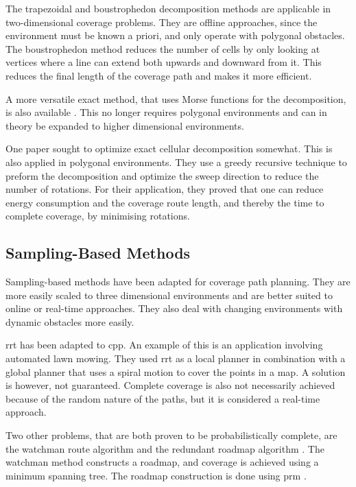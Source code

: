 The trapezoidal and boustrophedon decomposition methods are applicable in two-dimensional coverage problems. They are offline approaches, since the environment must be known a priori, and only operate with polygonal obstacles. The boustrophedon method reduces the number of cells by only looking at vertices where a line can extend both upwards and downward from it. This reduces the final length of the coverage path and makes it more efficient. \cite{CPP-Survey-2013} 

A more versatile exact method, that uses Morse functions for the decomposition, is also available \cite{Choset-Morse2000}. This no longer requires polygonal environments and can in theory be expanded to higher dimensional environments.

One paper sought to optimize exact cellular decomposition somewhat. This is also applied in polygonal environments. They use a greedy recursive technique to preform the decomposition and optimize the sweep direction to reduce the number of rotations. For their application, they proved that one can reduce energy consumption and the coverage route length, and thereby the time to complete coverage, by minimising rotations. \cite{Li2011}
\subsection{Sampling-Based Methods}
\label{sec:LR - sSampling}
Sampling-based methods have been adapted for coverage path planning. They are more easily scaled to three dimensional environments and are better suited to online or real-time approaches. They also deal with changing environments with dynamic obstacles more easily. \cite{Lavalle2006}

\ac{rrt} has been adapted to \ac{cpp}. An example of this is an application involving automated lawn mowing. They used \ac{rrt} as a local planner in combination with a global planner that uses a spiral motion to cover the points in a map. A solution is however, not guaranteed. Complete coverage is also not necessarily achieved because of the random nature of the paths, but it is considered a real-time approach. \cite{Nourani-Vatani2006}

Two other problems, that are both proven to be probabilistically complete, are the watchman route algorithm and the redundant roadmap algorithm \cite{Englot2012}. The watchman method constructs a roadmap, and coverage is achieved using a minimum spanning tree. The roadmap construction is done using \ac{prm} \cite{Danner2000}.%

